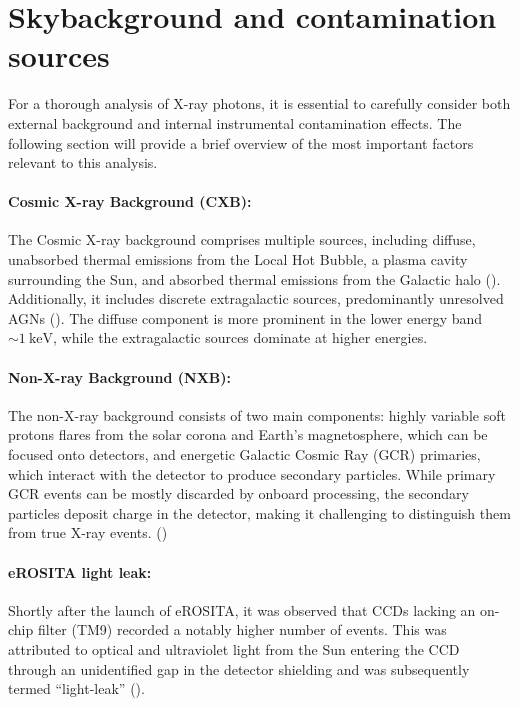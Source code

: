 %
\section{Skybackground and contamination sources}\label{sec:background}
For a thorough analysis of X-ray photons, it is essential to carefully consider both external background and internal instrumental contamination effects. The following section will provide a brief overview of the most important factors relevant to this analysis.
\paragraph*{Cosmic X-ray Background (CXB):} The Cosmic X-ray background comprises multiple sources, including diffuse, unabsorbed thermal emissions from the Local Hot Bubble, a plasma cavity surrounding the Sun, and absorbed thermal emissions from the Galactic halo (\cite{galeazzi2006xmm}). Additionally, it includes discrete extragalactic sources, predominantly unresolved AGNs  (\cite{brandt2005deep}). The diffuse component is more prominent in the lower energy band \(\sim\SI{1}{\kilo\electronvolt}\), while the extragalactic sources dominate at higher energies.
\paragraph*{Non-X-ray Background (NXB):} The non-X-ray background consists of two main components: highly variable soft protons flares from the solar corona and Earth's magnetosphere, which can be focused onto detectors, and energetic Galactic Cosmic Ray (GCR) primaries, which interact with the detector to produce secondary particles. While primary GCR events can be mostly discarded by onboard processing, the secondary particles deposit charge in the detector, making it challenging to distinguish them from true X-ray events. (\cite{Bulbul_2020})
\paragraph*{eROSITA light leak:} Shortly after the launch of eROSITA, it was observed that CCDs lacking an on-chip filter (TM9) recorded a notably higher number of events. This was attributed to optical and ultraviolet light from the Sun entering the CCD through an unidentified gap in the detector shielding and was subsequently termed \enquote{light-leak} (\cite{Predehl2021}). 
